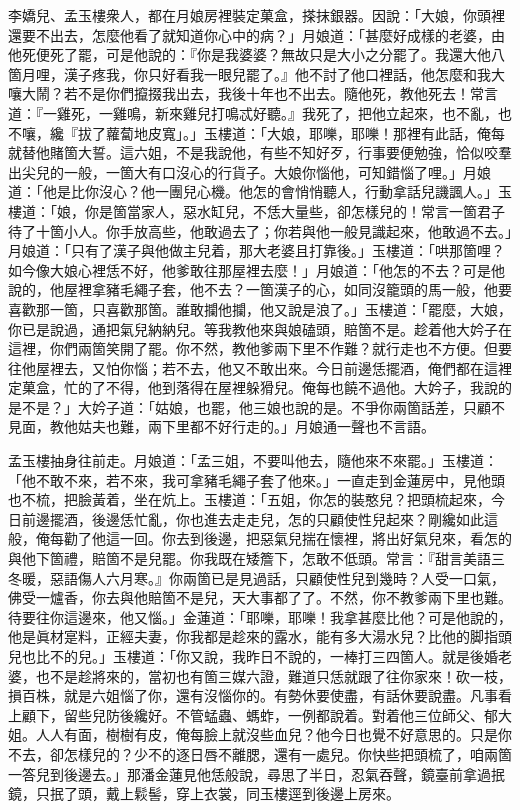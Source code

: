 李嬌兒、孟玉樓衆人，都在月娘房裡裝定菓盒，搽抹銀器。因說：「大娘，你頭裡還要不出去，怎麼他看了就知道你心中的病？」月娘道：「甚麼好成樣的老婆，由他死便死了罷，可是他說的：『你是我婆婆？無故只是大小之分罷了。我還大他八箇月哩，漢子疼我，你只好看我一眼兒罷了。』他不討了他口裡話，他怎麼和我大嚷大鬧？{}若不是你們攛掇我出去，我後十年也不出去。隨他死，教他死去！常言道：『一雞死，一雞鳴，新來雞兒打鳴忒好聽。』{}我死了，把他立起來，也不亂，也不嚷，纔『拔了蘿蔔地皮寬」。」玉樓道：「大娘，耶嚛，耶嚛！那裡有此話，俺每就替他賭箇大誓。這六姐，不是我說他，有些不知好歹，行事要便勉強，恰似咬羣出尖兒的一般，一箇大有口沒心的行貨子。{}大娘你惱他，可知錯惱了哩。」{}月娘道：「他是比你沒心？他一團兒心機。他怎的會悄悄聽人，行動拿話兒譏諷人。」玉樓道：「娘，你是箇當家人，惡水缸兒，不恁大量些，卻怎樣兒的！常言一箇君子待了十箇小人。{}你手放高些，他敢過去了；你若與他一般見識起來，他敢過不去。」月娘道：「只有了漢子與他做主兒着，那大老婆且打靠後。」玉樓道：「哄那箇哩？如今像大娘心裡恁不好，他爹敢往那屋裡去麼！」月娘道：「他怎的不去？可是他說的，他屋裡拿豬毛繩子套，他不去？一箇漢子的心，如同沒籠頭的馬一般，他要喜歡那一箇，只喜歡那箇。誰敢攔他攔，他又說是浪了。」{}玉樓道：「罷麼，大娘，你已是說過，通把氣兒納納兒。等我教他來與娘磕頭，賠箇不是。趁着他大妗子在這裡，你們兩箇笑開了罷。你不然，教他爹兩下里不作難？就行走也不方便。但要往他屋裡去，又怕你惱；若不去，他又不敢出來。今日前邊恁擺酒，俺們都在這裡定菓盒，忙的了不得，他到落得在屋裡躲猾兒。俺每也饒不過他。大妗子，我說的是不是？」大妗子道：「姑娘，也罷，他三娘也說的是。不爭你兩箇話差，只顧不見面，教他姑夫也難，兩下里都不好行走的。」月娘通一聲也不言語。

孟玉樓抽身往前走。{}月娘道：「孟三姐，不要叫他去，隨他來不來罷。」玉樓道：「他不敢不來，若不來，我可拿豬毛繩子套了他來。」{}{}一直走到金蓮房中，見他頭也不梳，把臉黃着，坐在炕上。玉樓道：「五姐，你怎的裝憨兒？把頭梳起來，今日前邊擺酒，後邊恁忙亂，你也進去走走兒，怎的只顧使性兒起來？剛纔如此這般，俺每勸了他這一回。你去到後邊，把惡氣兒揣在懷裡，將出好氣兒來，看怎的與他下箇禮，賠箇不是兒罷。你我既在矮簷下，怎敢不低頭。常言：『甜言美語三冬暖，惡語傷人六月寒。』你兩箇已是見過話，只顧使性兒到幾時？人受一口氣，佛受一爐香，你去與他賠箇不是兒，天大事都了了。不然，你不教爹兩下里也難。待要往你這邊來，他又惱。」{}金蓮道：「耶嚛，耶嚛！我拿甚麼比他？{}可是他說的，他是眞材寔料，正經夫妻，你我都是趁來的露水，能有多大湯水兒？比他的脚指頭兒也比不的兒。」玉樓道：「你又說，我昨日不說的，一棒打三四箇人。就是後婚老婆，也不是趁將來的，當初也有箇三媒六證，難道只恁就跟了往你家來！砍一枝，損百株，就是六姐惱了你，還有沒惱你的。有勢休要使盡，有話休要說盡。凡事看上顧下，留些兒防後纔好。不管蜢蟲、螞蚱，一例都說着。對着他三位師父、郁大姐。人人有面，樹樹有皮，俺每臉上就沒些血兒？他今日也覺不好意思的。只是你不去，卻怎樣兒的？少不的逐日唇不離腮，還有一處兒。你快些把頭梳了，咱兩箇一答兒到後邊去。」那潘金蓮見他恁般說，尋思了半日，忍氣吞聲，{}鏡臺前拿過抿鏡，只抿了頭，戴上鬏髻，穿上衣裳，同玉樓逕到後邊上房來。

